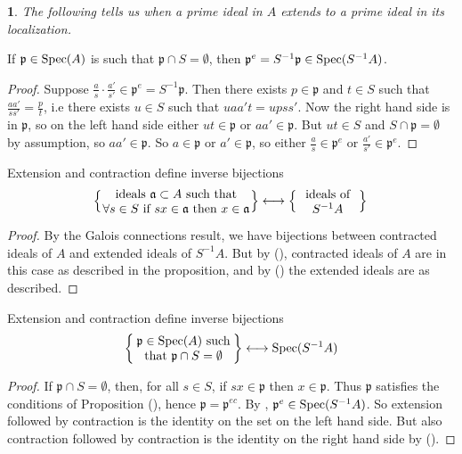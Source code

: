 \documentclass[12pt]{article}
\newtheorem{para}[theorem]{}
\begin{document}
\begin{para}
	The following tells us when a prime ideal in $A$ extends to a prime ideal in its localization.
\end{para}

\begin{proposition}
	If $\mathfrak{p}\in\text{Spec}(A)$ is such that $\mathfrak{p}\cap S=\emptyset$, then $\mathfrak{p}^e=S^{-1}\mathfrak{p}\in\text{Spec}(S^{-1}A)$.
\end{proposition}
\begin{proof}
	Suppose $\frac{a}{s}\cdot\frac{a'}{s'}\in\mathfrak{p}^e=S^{-1}\mathfrak{p}$. Then there exists $p\in\mathfrak{p}$ and $t\in S$ such that $\frac{aa'}{ss'}=\frac{p}{t}$, i.e there exists $u\in S$ such that $uaa't=upss'$. Now the right hand side is in $\mathfrak{p}$, so on the left hand side either $ut\in\mathfrak{p}$ or $aa'\in\mathfrak{p}$. But $ut\in S$ and $S\cap\mathfrak{p}=\emptyset$ by assumption, so $aa'\in\mathfrak{p}$. So $a\in\mathfrak{p}$ or $a'\in\mathfrak{p}$, so either $\frac{a}{s}\in\mathfrak{p}^e$ or $\frac{a'}{s'}\in\mathfrak{p}^e$.
\end{proof}

\begin{proposition}
	Extension and contraction define inverse bijections 
	\begin{equation*}
		\left\{\parbox{12em}{\centering{ideals $\mathfrak{a}\subset A$ such that $\forall s\in S$ if $sx\in\mathfrak{a}$ then $x\in\mathfrak{a}$}}\right\} \longleftrightarrow \left\{\parbox{5em}{\centering{ideals of $S^{-1}A$}}\right\} \\
	\end{equation*}
\end{proposition}
\begin{proof}
	By the Galois connections result, we have bijections between contracted ideals of $A$ and extended ideals of $S^{-1}A$. But by (), contracted ideals of $A$ are in this case as described in the proposition, and by () the extended ideals are as described.
\end{proof}

\begin{proposition}
\label{prop_bij_primes_avoiding_s_primes_in_localization}
	Extension and contraction define inverse bijections 
	\begin{equation*}
		\left\{\parbox{8em}{\centering{$\mathfrak{p}\in\Spec(A)$ such that $\mathfrak{p}\cap S=\emptyset$}}\right\} \longleftrightarrow \Spec(S^{-1}A) \\
	\end{equation*}
\end{proposition}
\begin{proof}
	If $\mathfrak{p}\cap S=\emptyset$, then, for all $s\in S$, if $sx\in\mathfrak{p}$ then $x\in\mathfrak{p}$. Thus $\mathfrak{p}$ satisfies the conditions of Proposition (), hence $\mathfrak{p}=\mathfrak{p}^{ec}$. By , $\mathfrak{p}^e\in\text{Spec}(S^{-1}A)$. So extension followed by contraction is the identity on the set on the left hand side. But also contraction followed by contraction is the identity on the right hand side by ().
\end{proof}
\end{document}
